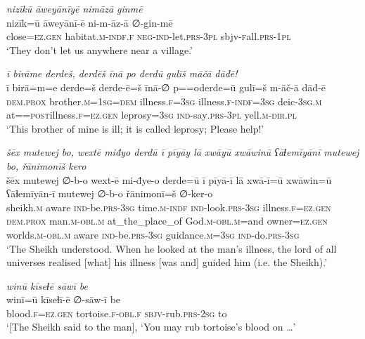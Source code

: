\ea \label{DG.42}
\textit{nizīkū āweyānīyē nimāzā ginmē} \\ 
\gll nizīk=ū āweyānī-ē ni-m-āz-ā ∅-gin-mē \\ 
 close\textsc{=ez}\textsc{.gen} habitat\textsc{\textsc{.m}}\textsc{-indf}\textsc{\textsc{.f}} \textsc{neg-}\textsc{ind-}let\textsc{.prs}\textsc{-3pl} sbjv\textsc{-f}all\textsc{.prs}\textsc{-1pl} \\ 
\glt `They don’t let us anywhere near a village.'
\z 
 
\ea \label{DG.43}
\textit{ī birāme derdeš, derdēš īnā po derdū gulīš māčā dāđē!} \\ 
\gll ī birā=m=e derde=š derde-ē=š īnā-∅ p==oderde=ū gulī=š m-āč-ā dāđ-ē \\ 
 \textsc{dem.prox} brother\textsc{.m}\textsc{=1sg}\textsc{=dem} illness\textsc{\textsc{.f}}\textsc{=3sg} illness\textsc{\textsc{.f}}\textsc{-indf}\textsc{=3sg} deic\textsc{-3sg}\textsc{.m} at=\textsc{=\textsc{post}}illness\textsc{\textsc{.f}}\textsc{=ez}\textsc{.gen} leprosy\textsc{=3sg} \textsc{ind-}say\textsc{.prs}\textsc{-3pl} yell\textsc{.m}\textsc{-dir}\textsc{.pl} \\ 
\glt `This brother of mine is ill; it is called leprosy; Please help!'
\z 
 
\ea \label{DG.46}
\textit{šēx mutewej bo, wextē miđyo derdū ī pīyāy lā xwāyū xwāwinū ʕāɫemīyānī mutewej bo, řānimonīš kero} \\ 
\gll šēx mutewej ∅-b-o wext-ē mi-đye-o derde=ū ī pīyā-ī lā xwā-ī=ū xwāwin=ū ʕāɫemīyān-ī mutewej ∅-b-o řānimonī=š ∅-ker-o \\ 
 sheikh\textsc{.m} aware \textsc{ind-}be\textsc{.prs}\textsc{-3sg} time\textsc{.m}\textsc{-indf} \textsc{ind-}look\textsc{.prs}\textsc{-3sg} illness\textsc{\textsc{.f}}\textsc{=ez}\textsc{.gen} \textsc{dem.prox} man\textsc{.m}\textsc{-obl}\textsc{.m} at\_the\_place\_of God\textsc{.m}\textsc{-obl}\textsc{.m}=and owner\textsc{=ez}\textsc{.gen} worlds\textsc{.m}\textsc{-obl}\textsc{.m} aware \textsc{ind-}be\textsc{.prs}\textsc{-3sg} guidance\textsc{.m}\textsc{=3sg} \textsc{ind-}do\textsc{.prs}\textsc{-3sg} \\ 
\glt `The Sheikh understood. When he looked at the man’s illness, the lord of all universes realised [what] his illness [was and] guided him (i.e. the Sheikh).'
\z 
 
\ea \label{DG.47}
\textit{winū kīseɫē sāwī be} \\ 
\gll winī=ū kīseɫī-ē ∅-sāw-ī be \\ 
 blood\textsc{\textsc{.f}}\textsc{=ez}\textsc{.gen} tortoise\textsc{\textsc{.f}}\textsc{-obl}\textsc{\textsc{.f}} \textsc{sbjv-}rub\textsc{.prs}-\textsc{2sg} to \\ 
\glt `[The Sheikh said to the man], ‘You may rub tortoise’s blood on …'
\z 
 
